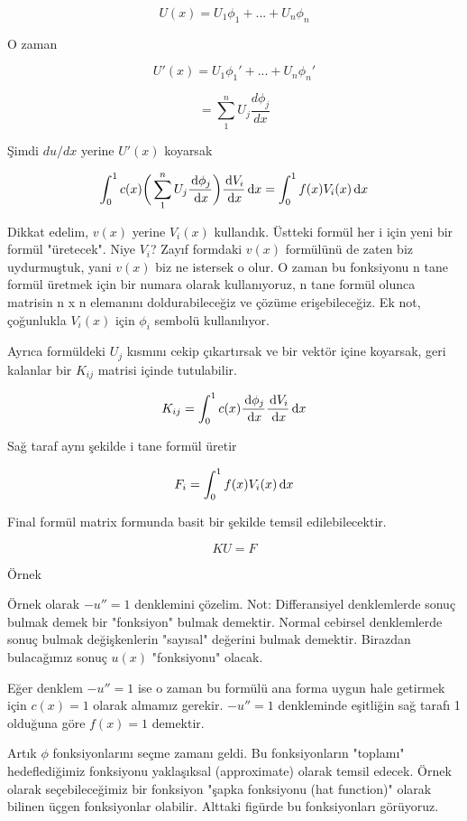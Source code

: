 \documentclass[12pt,fleqn]{article}\usepackage{../../common}
\begin{document}
$$ U(x) = U_1 \phi_1+ ... + U_n\phi_n $$

O zaman

$$ U'(x) = U_1 \phi_1'+ ... + U_n\phi_n' $$

$$ = \sum_1^n U_j \frac{d\phi_j}{dx} $$

Şimdi $du / dx$ yerine $U'(x)$ koyarsak

$$
\int_0^1 c(x) \bigg( \sum_1^n U_j \frac{\,\mathrm{d}\phi_j}{\,\mathrm{d} x}\bigg)
\frac{\,\mathrm{d} V_i}{\,\mathrm{d} x}\,\mathrm{d} x
= \int_0^1 f(x)V_i(x)\,\mathrm{d} x
$$

Dikkat edelim, $v(x)$ yerine $V_i(x)$ kullandık. Üstteki formül her i için yeni
bir formül "üretecek". Niye $V_i$? Zayıf formdaki $v(x)$ formülünü de zaten biz
uydurmuştuk, yani $v(x)$ biz ne istersek o olur. O zaman bu fonksiyonu n tane
formül üretmek için bir numara olarak kullanıyoruz, n tane formül olunca
matrisin n x n elemanını doldurabileceğiz ve çözüme erişebileceğiz. Ek not,
çoğunlukla $V_i(x)$ için $\phi_i$ sembolü kullanılıyor.

Ayrıca formüldeki $U_j$ kısmını cekip çıkartırsak ve bir vektör içine koyarsak,
geri kalanlar bir $K_{ij}$ matrisi içinde tutulabilir. 

$$ K_{ij} = \int_0^1 c(x) \frac{\,\mathrm{d}\phi_j}{\,\mathrm{d} x} \frac{\,\mathrm{d} V_i}{\,\mathrm{d} x} \,\mathrm{d} x  $$

Sağ taraf aynı şekilde i tane formül üretir

$$ F_i = \int_0^1 f(x)V_i(x) \,\mathrm{d} x $$

Final formül matrix formunda basit bir şekilde temsil edilebilecektir. 

$$ KU = F $$

Örnek

Örnek olarak $-u'' = 1$ denklemini çözelim. Not: Differansiyel
denklemlerde sonuç bulmak demek bir "fonksiyon" bulmak
demektir. Normal cebirsel denklemlerde sonuç bulmak değişkenlerin
"sayısal" değerini bulmak demektir. Birazdan bulacağımız sonuç
$u(x)$ "fonksiyonu" olacak.

Eğer denklem $-u''=1$ ise o zaman bu formülü ana forma uygun hale
getirmek için $c(x) = 1$ olarak almamız gerekir. $-u''=1$ denkleminde
eşitliğin sağ tarafı 1 olduğuna göre $f(x) = 1$ demektir.

Artık $\phi$ fonksiyonlarını seçme zamanı geldi. Bu fonksiyonların
"toplamı" hedeflediğimiz fonksiyonu yaklaşıksal (approximate) olarak
temsil edecek. Örnek olarak seçebileceğimiz bir fonksiyon "şapka
fonksiyonu (hat function)" olarak bilinen üçgen fonksiyonlar
olabilir. Alttaki figürde bu fonksiyonları görüyoruz.
\end{document}
